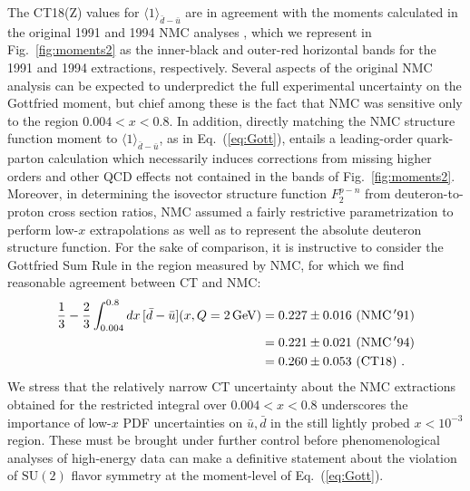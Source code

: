 The CT18(Z) values for $\langle 1 \rangle_{\bar{d}-\bar{u}}$ are in agreement with the moments calculated in the original 1991 and 1994 NMC analyses
\cite{Amaudruz:1991at,Arneodo:1994sh}, which we represent in Fig.~\ref{fig:moments2} as the inner-black and outer-red horizontal bands for the
1991 \cite{Amaudruz:1991at} and 1994 \cite{Arneodo:1994sh} extractions, respectively. Several aspects of the original NMC analysis can be expected
to underpredict the full experimental uncertainty on the Gottfried moment, but chief among these is the fact that NMC was sensitive only to the
region $0.004\! <\! x\! <\! 0.8$. In addition, directly matching the NMC structure function moment to $\langle 1 \rangle_{\bar{d}-\bar{u}}$, as in
Eq.~(\ref{eq:Gott}), entails a leading-order quark-parton calculation which necessarily induces corrections from missing higher orders and other QCD
effects not contained in the bands of Fig.~\ref{fig:moments2}. Moreover, in determining the isovector structure function $F^{p-n}_2$ from deuteron-to-proton cross section ratios,
NMC assumed a fairly restrictive parametrization to perform low-$x$ extrapolations as well as to represent the absolute deuteron structure function.
For the sake of comparison, it is instructive to consider the Gottfried Sum Rule in the region measured by NMC, for which we find reasonable agreement
between CT and NMC:
%
\begin{align}
	\frac{1}{3} - \frac{2}{3}\int_{0.004}^{0.8} dx\, [\bar{d}-\bar{u}](x,\Q=2\,\mathrm{GeV}) &= 0.227 \pm 0.016\ (\mathrm{NMC\, '91 }) \\
											       &= 0.221 \pm 0.021\ (\mathrm{NMC\, '94 }) \\
											       &= 0.260 \pm 0.053\ (\mathrm{CT18})\ .
\end{align}
%
We stress that the relatively narrow CT uncertainty about the NMC extractions obtained for the restricted integral over $0.004\! <\! x\! <\! 0.8$ underscores the
importance of low-$x$ PDF uncertainties on $\bar{u}, \bar{d}$ in the still lightly probed $x\! <\! 10^{-3}$ region. These must be brought under further control before
phenomenological analyses of high-energy data can make a definitive statement about the violation of $\mathrm{SU}(2)$ flavor symmetry at the moment-level of
Eq.~(\ref{eq:Gott}).



